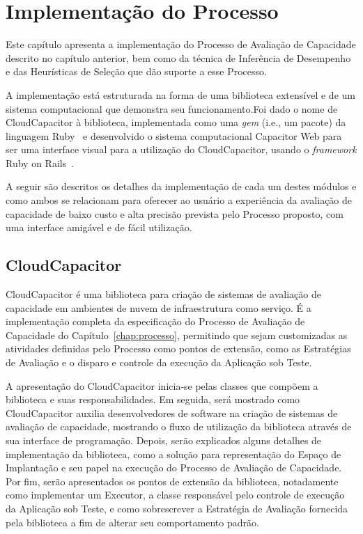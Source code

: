 \chapter{Implementação do Processo}
\label{chap:capacitor}
Este capítulo apresenta a implementação do
Processo de Avaliação de Capacidade descrito no capítulo anterior, bem como da técnica de
Inferência de Desempenho e das Heurísticas de Seleção que dão suporte a esse
Processo. 

A implementação está estruturada na forma de uma biblioteca
extensível e de um sistema computacional que demonstra seu funcionamento.Foi dado o nome de 
CloudCapacitor à biblioteca, implementada como uma \emph{gem}
(i.e., um pacote) da linguagem Ruby~\cite{ruby} e desenvolvido o sistema
computacional Capacitor Web para ser uma interface visual para a utilização do CloudCapacitor, usando 
o \emph{framework} Ruby on Rails~\cite{rails}.  

A seguir são descritos os detalhes da implementação de cada um destes módulos e
como ambos se relacionam para oferecer ao usuário a experiência da avaliação de capacidade
de baixo custo e alta precisão prevista pelo Processo proposto, com uma interface
amigável e de fácil utilização.

\section{CloudCapacitor}
CloudCapacitor é uma biblioteca para criação de sistemas de avaliação de 
capacidade em ambientes de nuvem de infraestrutura como serviço. É a implementação
completa da especificação do Processo de Avaliação de Capacidade do 
Capítulo~\ref{chap:processo}, permitindo que sejam customizadas as atividades 
definidas pelo Processo como pontos de extensão, como as Estratégias de Avaliação
e o disparo e controle da execução da Aplicação sob Teste.

A apresentação do CloudCapacitor inicia-se pelas classes que compõem a biblioteca
e suas responsabilidades. Em seguida, será mostrado como CloudCapacitor auxilia 
desenvolvedores de software na criação de sistemas de avaliação de capacidade,
mostrando o fluxo de utilização da biblioteca através de sua interface de programação.
Depois, serão explicados alguns detalhes de implementação da biblioteca, como 
a solução para representação do Espaço de Implantação e seu papel na execução do
Processo de Avaliação de Capacidade. Por fim, serão apresentados os pontos de extensão
da biblioteca, notadamente como implementar um Executor, a classe responsável pelo
controle de execução da Aplicação sob Teste, e como sobrescrever a Estratégia de
Avaliação fornecida pela biblioteca a fim de alterar seu comportamento padrão.

